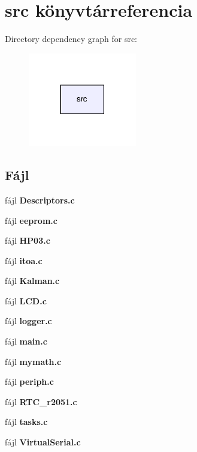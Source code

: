 \section{src könyvtárreferencia}
\label{dir_68267d1309a1af8e8297ef4c3efbcdba}
Directory dependency graph for src\-:\nopagebreak
\begin{figure}[H]
\begin{center}
\leavevmode
\includegraphics[width=134pt]{dir_68267d1309a1af8e8297ef4c3efbcdba_dep}
\end{center}
\end{figure}
\subsection*{Fájl}
\begin{DoxyCompactItemize}
\item 
fájl {\bf Descriptors.\-c}
\item 
fájl {\bf eeprom.\-c}
\item 
fájl {\bf H\-P03.\-c}
\item 
fájl {\bf itoa.\-c}
\item 
fájl {\bf Kalman.\-c}
\item 
fájl {\bf L\-C\-D.\-c}
\item 
fájl {\bf logger.\-c}
\item 
fájl {\bf main.\-c}
\item 
fájl {\bf mymath.\-c}
\item 
fájl {\bf periph.\-c}
\item 
fájl {\bf R\-T\-C\-\_\-r2051.\-c}
\item 
fájl {\bf tasks.\-c}
\item 
fájl {\bf Virtual\-Serial.\-c}
\end{DoxyCompactItemize}
